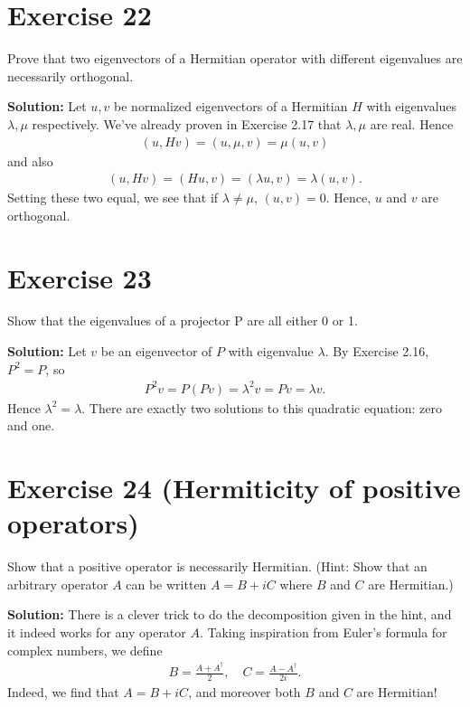 \documentclass{book}
\begin{document}
\section*{Exercise 22}
    Prove that two eigenvectors of a Hermitian operator with different eigenvalues are necessarily orthogonal.
    
    \textbf{Solution:} Let $u, v$ be normalized eigenvectors of a Hermitian $H$ with eigenvalues $\lambda, \mu$ respectively. We've already proven in Exercise 2.17 that $\lambda, \mu$ are real. Hence
    \begin{align}
        (u, Hv) = (u, \mu, v) = \mu (u,v)
    \end{align}
    and also
    \begin{align}
        (u, Hv) = (H u, v) = (\lambda u, v) = \lambda (u,v).
    \end{align}
    Setting these two equal, we see that if $\lambda \neq \mu$, $(u,v) = 0$. Hence, $u$ and $v$ are orthogonal.
    
\section*{Exercise 23}
    Show that the eigenvalues of a projector P are all either 0 or 1.
    
    \textbf{Solution:} Let $v$ be an eigenvector of $P$ with eigenvalue $\lambda$. By Exercise 2.16, $P^2 = P$, so
    \begin{align}
        P^2 v = P (Pv) = \lambda^2 v = P v = \lambda v.
    \end{align}
    Hence $\lambda^2 = \lambda$. There are exactly two solutions to this quadratic equation: zero and one.
    
\section*{Exercise 24 (Hermiticity of positive operators)}
    Show that a positive operator is necessarily Hermitian. (Hint: Show that an arbitrary operator $A$ can be written $A = B + iC$ where $B$ and $C$ are Hermitian.)
    
    \textbf{Solution:} There is a clever trick to do the decomposition given in the hint, and it indeed works for any operator $A$. Taking inspiration from Euler's formula for complex numbers, we define
    \begin{align}
        B = \frac{A + A^\dagger}{2}, \quad C = \frac{A - A^\dagger }{2i}.
    \end{align}
    Indeed, we find that $A = B + i C$, and moreover both $B$ and $C$ are Hermitian! 
    
\end{document}
